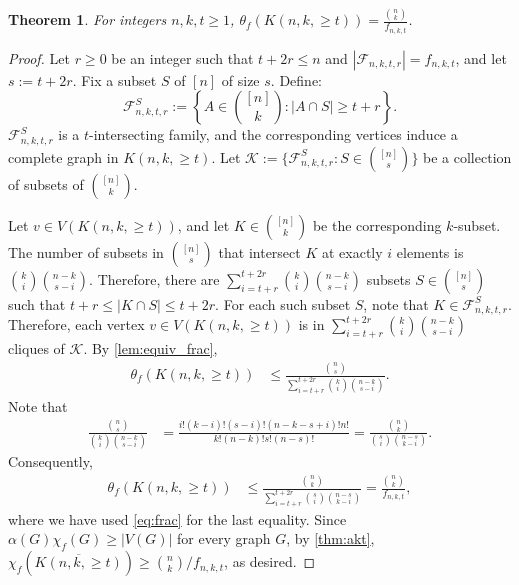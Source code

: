 \documentclass[11pt]{article}
\numberwithin{equation}{section}
\theoremstyle{plain}
\newtheorem{thm}[equation]{Theorem}
\theoremstyle{definition}
\renewcommand{\geq}{\geqslant}
\renewcommand{\leq}{\leqslant}
\begin{document}
\begin{thm}
    \label{thm:fractional_kneser_graphs}
    For integers $n,k,t \geq 1$, $
        \theta_f(K(n,k,\geq t)) = \frac{\binom{n}{k}}{f_{n,k,t}} $.
\end{thm}
\begin{proof}
    Let $r \geq 0$ be an integer such that $t + 2r \leq n$ and $\left|\mathcal{F}_{n,k,t,r}\right| = f_{n,k,t}$, and let $s := t + 2r$. Fix a subset $S$ of $[n]$ of size $s$. Define:
    \begin{equation*}
        \mathcal{F}_{n,k,t,r}^S := \left\{ A \in \binom{[n]}{k}: \left|A \cap S \right| \geq t+ r \right\}.
    \end{equation*}
    $\mathcal{F}_{n,k,t,r}^S $ is a $t$-intersecting family, and the corresponding vertices induce a complete graph in $K(n, k, \geq t)$.
    Let $\mathcal{K}:= \{ \mathcal{F}_{n,k,t,r}^S: S \in \binom{[n]}{s} \}$ be a collection of subsets of $\binom{[n]}{k}$.

    Let $v \in V(K(n,k,\geq t))$, and let $K \in \binom{[n]}{k}$ be the corresponding $k$-subset. The number of subsets in $\binom{[n]}{s}$ that intersect $K$ at exactly $i$ elements is $\binom{k}{i} \binom{n-k}{s-i}$. Therefore, there are
    $
        \sum_{i=t+r}^{t+2r} \binom{k}{i} \binom{n-k}{s-i}
    $
    subsets $S \in \binom{[n]}{s}$ such that $t + r \leq |K \cap S| \leq t + 2r$. For each such subset $S$, note that $K \in \mathcal{F}_{n,k,t,r}^S$. Therefore, each vertex $v \in V(K(n,k,\geq t))$ is in $\sum_{i=t+r}^{t+2r} \binom{k}{i} \binom{n-k}{s-i}$ cliques of $\mathcal{K}$.
    By \cref{lem:equiv_frac},
    \begin{align*}
        \theta_f(K(n,k,\geq t)) & \leq \frac{\binom{n}{s}}{\sum_{i=t+r}^{t+2r} \binom{k}{i} \binom{n-k}{s-i}}.
    \end{align*}
    Note that
    \begin{align*}
        \frac{\binom{n}{s}}{\binom{k}{i} \binom{n-k}{s-i}} & = \frac{i! (k-i)! (s-i)! (n-k-s+i)! n!}{k! (n-k)! s! (n-s)!} = \frac{\binom{n}{k}}{\binom{s}{i} \binom{n-s}{k-i}}.
    \end{align*}
    Consequently,
    \begin{align*}
        \theta_f(K(n,k,\geq t)) & \leq \frac{\binom{n}{k}}{\sum_{i=t+r}^{t+2r} \binom{s}{i} \binom{n-s}{k-i}} = \frac{\binom{n}{k}}{f_{n,k,t}},
    \end{align*}
    where we have used \cref{eq:frac} for the last equality. Since $\alpha(G) \chi_f(G) \geq |V(G)|$ for every graph $G$, by \cref{thm:akt}, $\chi_f(\overline{K(n,k,\geq t)}) \geq \binom{n}{k} / f_{n,k,t}$, as desired.
\end{proof}
\end{document}
